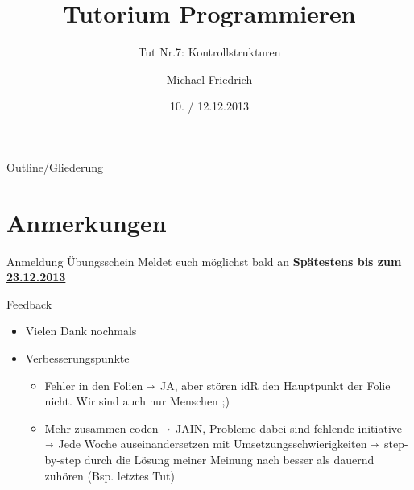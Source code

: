 \documentclass[18pt]{beamer}
\title[Prog Tut Nr. 7]{Tutorium Programmieren}
\subtitle{Tut Nr.7: Kontrollstrukturen}
\author{Michael Friedrich}
\date{10. / 12.12.2013}
\institute{Institut f\"ur theoretische Informatik}
\begin{document}

\begin{frame}
	\titlepage
\end{frame}

\begin{frame}{Outline/Gliederung}
	\tableofcontents
\end{frame}

\section{Anmerkungen}
\begin{frame}{Anmeldung Übungsschein}
	Meldet euch möglichst bald an \newline
	\vspace{2cm}
	\huge \textbf{Spätestens bis zum \underline{23.12.2013}}
\end{frame}
\begin{frame}[fragile]{Feedback}
\begin{itemize}
	\item Vielen Dank nochmals\pause
	\vspace{1cm}
	\item Verbesserungspunkte\pause
	
	\begin{itemize}
		\item Fehler in den Folien \pause
		$\shortrightarrow$ JA, aber stören idR den Hauptpunkt der Folie nicht. Wir sind auch nur Menschen ;) \pause
		\item Mehr zusammen coden \newline \pause
		$\shortrightarrow$ JAIN, Probleme dabei sind fehlende initiative \newline \pause
		$\shortrightarrow$ Jede Woche auseinandersetzen mit Umsetzungsschwierigkeiten \newline \pause
		$\shortrightarrow$ step-by-step durch die Lösung meiner Meinung nach besser als dauernd zuhören (Bsp. letztes Tut)
	\end{itemize}
\end{itemize}
\end{frame}


\appendix
\beginbackup


\backupend
\end{document}
